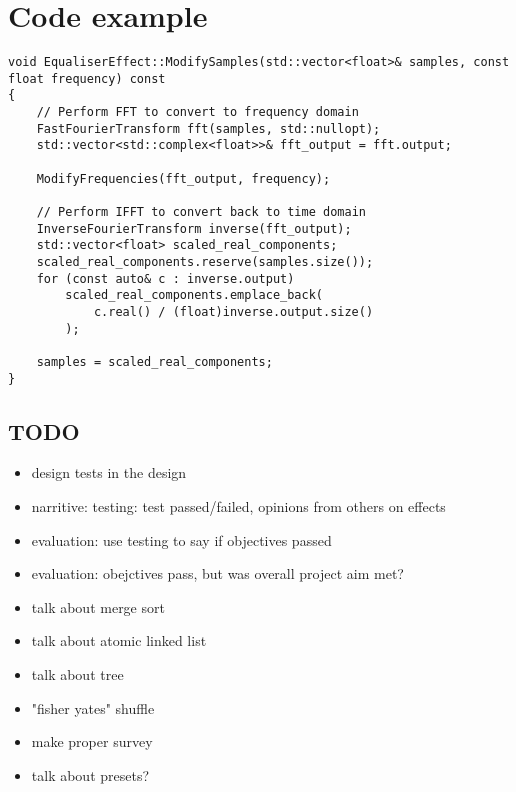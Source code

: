 \documentclass{article}
\begin{document}
	\section { Code example }
		\begin{verbatim}
void EqualiserEffect::ModifySamples(std::vector<float>& samples, const float frequency) const
{
	// Perform FFT to convert to frequency domain
	FastFourierTransform fft(samples, std::nullopt);
	std::vector<std::complex<float>>& fft_output = fft.output;

	ModifyFrequencies(fft_output, frequency);

	// Perform IFFT to convert back to time domain
	InverseFourierTransform inverse(fft_output);
	std::vector<float> scaled_real_components;
	scaled_real_components.reserve(samples.size());
	for (const auto& c : inverse.output)
		scaled_real_components.emplace_back(
			c.real() / (float)inverse.output.size()
		);

	samples = scaled_real_components;
}
	\end{verbatim}
	
	\subsection{TODO}
	\begin{itemize}
		\item design tests in the design
		\item narritive: testing: test passed/failed, opinions from others on effects
		\item evaluation: use testing to say if objectives passed
		\item evaluation: obejctives pass, but was overall project aim met?
		\item talk about merge sort
		\item talk about atomic linked list
		\item talk about tree
		\item "fisher yates" shuffle
		\item make proper survey
		\item talk about presets?
	\end{itemize}
	
\end{document}
